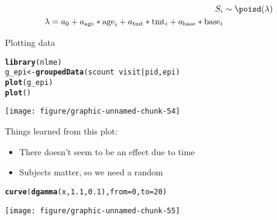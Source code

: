 \documentclass[12pt,letterpaper,oneside]{article}\usepackage{graphicx, color}
\makeatletter
\newcommand{\hlfunctioncall}[1]{\textcolor[rgb]{0.501960784313725,0,0.329411764705882}{\textbf{#1}}}%
\newenvironment{kframe}{%
 \def\at@end@of@kframe{}%
 \ifinner\ifhmode%
  \def\at@end@of@kframe{\end{minipage}}%
  \begin{minipage}{\columnwidth}%
 \fi\fi%
 \def\FrameCommand##1{\hskip\@totalleftmargin \hskip-\fboxsep
 \colorbox{shadecolor}{##1}\hskip-\fboxsep
     \hskip-\linewidth \hskip-\@totalleftmargin \hskip\columnwidth}%
 \MakeFramed {\advance\hsize-\width
   \@totalleftmargin\z@ \linewidth\hsize
   \@setminipage}}%
 {\par\unskip\endMakeFramed%
 \at@end@of@kframe}
\newenvironment{knitrout}{}{} %
\newcommand{\dateTaken}{January 7, 2013}
\makeatother
\begin{document}
\begin{align*}
    S_{i} &\sim \poisd(\lambda)\\
    \lambda = a_{0} + a_{\text{age}}*\text{age}_{i} + a_{\text{tmt}}*\text{tmt}_{i} + a_{\text{base}}*\text{base}_{i}
\end{align*}

\renewcommand{\dateTaken}{March 26, 2013}
\daysep
Plotting data
\begin{knitrout}\scriptsize
{}\color{fgcolor}\begin{kframe}
\begin{alltt}
\hlfunctioncall{library}(nlme)
g_epi <- \hlfunctioncall{groupedData}(scount ~ visit | pid, epi)
\hlfunctioncall{plot}(g_epi)
\hlfunctioncall{plot}()
\end{alltt}


{\ttfamily\noindent\bfseries\color{errorcolor}{\#\# Error: argument "x" is missing, with no default}}\end{kframe}

{\centering \texttt{[image: figure/graphic-unnamed-chunk-54]} 

}



\end{knitrout}


Things learned from this plot:
\begin{itemize}
    \item There doesn't seem to be an effect due to time
    \item Subjects matter, so we need a random
\end{itemize}

\begin{knitrout}\scriptsize
{}\color{fgcolor}\begin{kframe}
\begin{alltt}
\hlfunctioncall{curve}(\hlfunctioncall{dgamma}(x, 1.1, 0.1), from = 0, to = 20)
\end{alltt}
\end{kframe}

{\centering \texttt{[image: figure/graphic-unnamed-chunk-55]} 

}



\end{knitrout}
\end{document}
